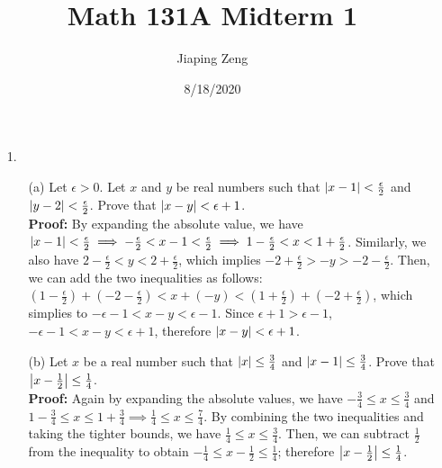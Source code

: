 \documentclass{article}
\title{Math 131A Midterm 1}
\author{Jiaping Zeng}
\date{8/18/2020}
\begin{document}
\begin{itemize}
    \item [1.]
          \begin{itemize}
              \item [(a)] Let $\epsilon>0$. Let $x$ and $y$ be real numbers such that $\abs{x-1}<\frac{\epsilon}{2}$ and $\abs{y-2}<\frac{\epsilon}{2}$. Prove that $\abs{x-y}<\epsilon+1$.\\
                    \textbf{Proof:} By expanding the absolute value, we have $\abs{x-1}<\frac{\epsilon}{2}\implies -\frac{\epsilon}{2}<x-1<\frac{\epsilon}{2}\implies 1-\frac{\epsilon}{2}<x<1+\frac{\epsilon}{2}$. Similarly, we also have $2-\frac{\epsilon}{2}<y<2+\frac{\epsilon}{2}$, which implies $-2+\frac{\epsilon}{2}>-y>-2-\frac{\epsilon}{2}$. Then, we can add the two inequalities as follows: $(1-\frac{\epsilon}{2})+(-2-\frac{\epsilon}{2})<x+(-y)<(1+\frac{\epsilon}{2})+(-2+\frac{\epsilon}{2})$, which simplies to $-\epsilon-1<x-y<\epsilon-1$. Since $\epsilon+1>\epsilon-1$, $-\epsilon-1<x-y<\epsilon+1$, therefore $\abs{x-y}<\epsilon+1$.
              \item [(b)] Let $x$ be a real number such that $\abs{x}\leq\frac{3}{4}$ and $\abs{x-1}\leq\frac{3}{4}$. Prove that $\abs{x-\frac{1}{2}}\leq\frac{1}{4}$.\\
                    \textbf{Proof:}  Again by expanding the absolute values, we have $-\frac{3}{4}\leq x\leq\frac{3}{4}$ and $1-\frac{3}{4}\leq x\leq 1+\frac{3}{4}\implies \frac{1}{4}\leq x\leq\frac{7}{4}$. By combining the two inequalities and taking the tighter bounds, we have $\frac{1}{4}\leq x\leq\frac{3}{4}$. Then, we can subtract $\frac{1}{2}$ from the inequality to obtain $-\frac{1}{4}\leq x-\frac{1}{2}\leq\frac{1}{4}$; therefore $\abs{x-\frac{1}{2}}\leq\frac{1}{4}$.
          \end{itemize}
\end{itemize}
\newpage
\end{document}

